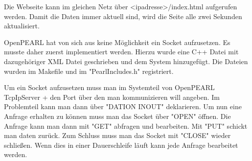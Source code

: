 Die Webseite kann im gleichen Netz über <ipadresse>/index.html aufgerufen werden. Damit die Daten immer aktuell sind, wird die Seite alle zwei Sekunden aktualisiert.

OpenPEARL hat von sich aus keine Möglichkeit ein Socket aufzusetzen. Es musste daher zuerst implementiert werden. Hierzu wurde eine C++ Datei mit dazugehöriger XML Datei geschrieben und dem System hinzugefügt. Die Dateien wurden im Makefile und im "PearlIncludes.h" registriert. 

Um ein Socket aufzusetzen muss man im Systemteil von OpenPEARL TcpIpServer + den Port über den man kommunizieren will angeben. Im Problemteil kann man dann über "DATION INOUT" deklarieren. Um nun eine Anfrage erhalten zu können muss man das Socket über "OPEN" öffnen. Die Anfrage kann man dann mit "GET" abfragen und bearbeiten. Mit "PUT" schickt man daten zurück. Zum Schluss muss man das Socket mit "CLOSE" wieder schließen. Wenn dies in einer Dauerschleife läuft kann jede Anfrage bearbeitet werden. 

